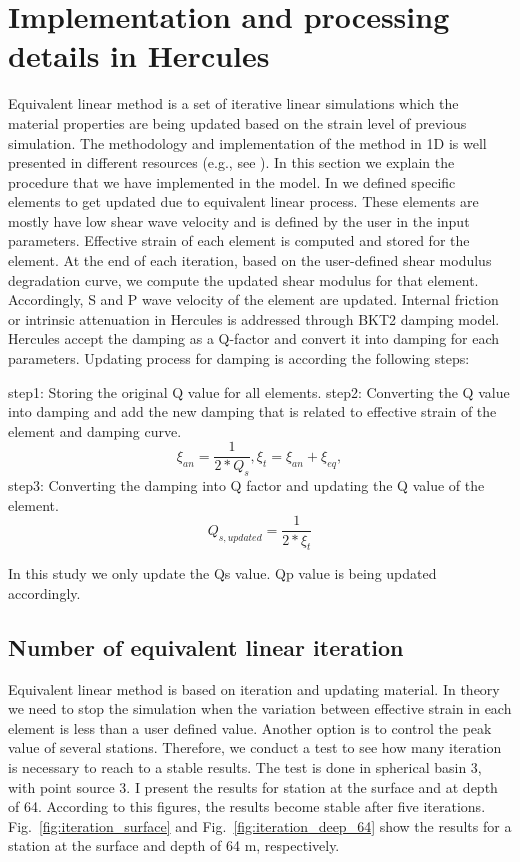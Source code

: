 
\section{Implementation and processing details in Hercules}

Equivalent linear method is a set of iterative linear simulations which the material properties are being updated based on the strain level of previous simulation. The methodology and implementation of the method in 1D is well presented in different resources (e.g., see \citet{Kramer1996geotechnical}). In this section we explain the procedure that we have implemented in the model. In we defined specific elements to get updated due to equivalent linear process. These elements are mostly have low shear wave velocity and is defined by the user in the input parameters. Effective strain of each element is computed and stored for the element. At the end of each iteration, based on the user-defined shear modulus degradation curve, we compute the updated shear modulus for that element. Accordingly, S and P wave velocity of the element are updated. Internal friction or intrinsic attenuation in Hercules is addressed through BKT2 damping model. Hercules accept the damping as a Q-factor and convert it into damping for each parameters.  Updating process for damping is according the following steps:

step1: Storing the original Q value for all elements.
step2: Converting the Q value into damping and add the new damping that is related to effective strain of the element and damping curve.
\begin{equation}
\xi_{an}=\frac{1}{2*Q_s}, 
\xi_{t}=\xi_{an} + \xi_{eq},
\end{equation}
step3: Converting the damping into Q factor and updating the Q value of the element. 
\begin{equation}
Q_{s,updated} = \frac{1}{2*\xi_{t}}
\end{equation}

In this study we only update the Qs value. Qp value is being updated accordingly.  


\subsection{Number of equivalent linear iteration}

Equivalent linear method is based on iteration and updating material. In theory we need to stop the simulation when the variation between effective strain in each element is less than a user defined value. Another option is to control the peak value of several stations. Therefore, we conduct a test to see how many iteration is necessary to reach to a stable results. The test is done in spherical basin 3, with point source 3. I present the results for station at the surface and at depth of 64. According to this figures, the results become stable after five iterations. Fig.~\ref{fig:iteration_surface} and Fig.~\ref{fig:iteration_deep_64}  show the results for a station at the surface and depth of 64 m, respectively.


